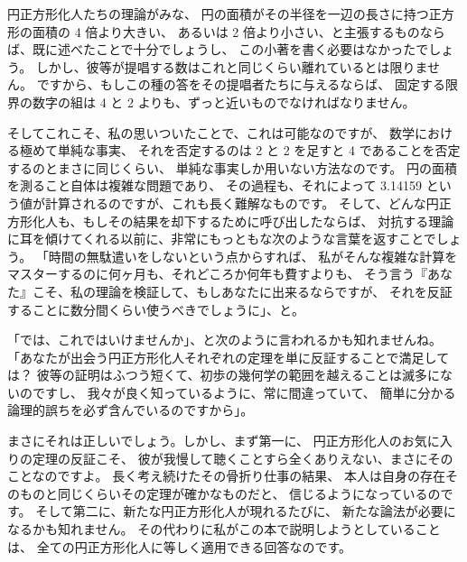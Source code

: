 \documentclass{article}
\begin{document}
円正方形化人たちの理論がみな、
円の面積がその半径を一辺の長さに持つ正方形の面積の 4 倍より大きい、
あるいは 2 倍より小さい、と主張するものならば、既に述べたことで十分でしょうし、
この小著を書く必要はなかったでしょう。
しかし、彼等が提唱する数はこれと同じくらい離れているとは限りません。
ですから、もしこの種の答をその提唱者たちに与えるならば、
固定する限界の数字の組は 4 と 2 よりも、ずっと近いものでなければなりません。

 そしてこれこそ、私の思いついたことで、これは可能なのですが、
数学における極めて単純な事実、
それを否定するのは 2 と 2 を足すと 4 であることを否定するのとまさに同じくらい、
単純な事実しか用いない方法なのです。
円の面積を測ること自体は複雑な問題であり、
その過程も、それによって 3.14159 という値が計算されるのですが、これも長く難解なものです。
そして、どんな円正方形化人も、もしその結果を却下するために呼び出したならば、
対抗する理論に耳を傾けてくれる以前に、非常にもっともな次のような言葉を返すことでしょう。
「時間の無駄遣いをしないという点からすれば、
私がそんな複雑な計算をマスターするのに何ヶ月も、それどころか何年も費すよりも、
そう言う『あなた』こそ、私の理論を検証して、もしあなたに出来るならですが、
それを反証することに数分間くらい使うべきでしょうに」、と。

 「では、これではいけませんか」、と次のように言われるかも知れませんね。
「あなたが出会う円正方形化人それぞれの定理を単に反証することで満足しては？
彼等の証明はふつう短くて、初歩の幾何学の範囲を越えることは滅多にないのですし、
我々が良く知っているように、常に間違っていて、
簡単に分かる論理的誤ちを必ず含んでいるのですから」。

 まさにそれは正しいでしょう。しかし、まず第一に、
円正方形化人のお気に入りの定理の反証こそ、
彼が我慢して聴くことすら全くありえない、まさにそのことなのですよ。
長く考え続けたその骨折り仕事の結果、
本人は自身の存在そのものと同じくらいその定理が確かなものだと、
信じるようになっているのです。
そして第二に、新たな円正方形化人が現れるたびに、
新たな論法が必要になるかも知れません。
その代わりに私がこの本で説明しようとしていることは、
全ての円正方形化人に等しく適用できる回答なのです。
\end{document}
